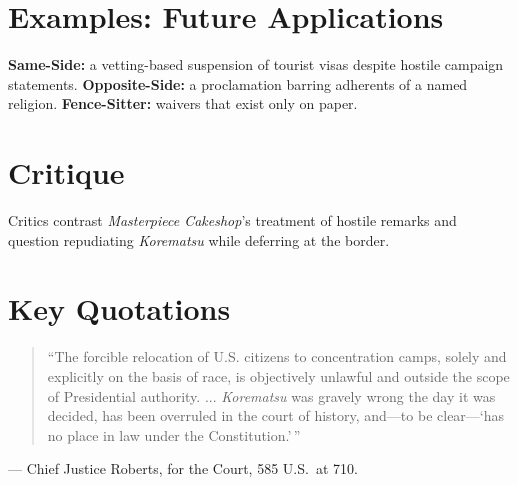 \documentclass[12pt]{article}
\begin{document}
\section{Examples: Future Applications}
\textbf{Same-Side:} a vetting-based suspension of tourist visas despite hostile campaign statements. \textbf{Opposite-Side:} a proclamation barring adherents of a named religion. \textbf{Fence-Sitter:} waivers that exist only on paper.

\section{Critique}
Critics contrast \textit{Masterpiece Cakeshop}'s treatment of hostile remarks and question repudiating \textit{Korematsu} while deferring at the border.

\section{Key Quotations}
\begin{quote}
``The forcible relocation of U.S. citizens to concentration camps, solely and explicitly on the basis of race, is objectively unlawful and outside the scope of Presidential authority. ... \textit{Korematsu} was gravely wrong the day it was decided, has been overruled in the court of history, and---to be clear---`has no place in law under the Constitution.'\,''
\end{quote}
\noindent --- Chief Justice Roberts, for the Court, 585 U.S.\ at 710.
\end{document}
